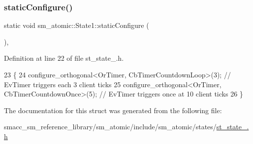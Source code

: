 \subsubsection{\texorpdfstring{static\+Configure()}{staticConfigure()}}
{\footnotesize\ttfamily static void sm\+\_\+atomic\+::\+State1\+::static\+Configure (\begin{DoxyParamCaption}{ }\end{DoxyParamCaption})\hspace{0.3cm}{\ttfamily [inline]}, {\ttfamily [static]}}



Definition at line 22 of file st\+\_\+state\+\_.\+h.


\begin{DoxyCode}
23     \{
24         configure\_orthogonal<OrTimer, CbTimerCountdownLoop>(3);  \textcolor{comment}{// EvTimer triggers each 3 client ticks}
25         configure\_orthogonal<OrTimer, CbTimerCountdownOnce>(5); \textcolor{comment}{// EvTimer triggers once at 10 client ticks}
26     \}
\end{DoxyCode}


The documentation for this struct was generated from the following file\+:\begin{DoxyCompactItemize}
\item 
smacc\+\_\+sm\+\_\+reference\+\_\+library/sm\+\_\+atomic/include/sm\+\_\+atomic/states/\hyperlink{sm__atomic_2include_2sm__atomic_2states_2st__state__1_8h}{st\+\_\+state\+\_.\+h}\end{DoxyCompactItemize}
